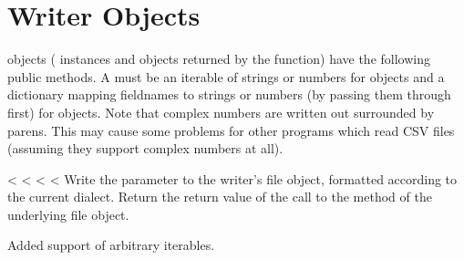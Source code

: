 \documentclass[letterpaper,10pt,english]{sphinxmanual}
\begin{document}
\section{Writer Objects}
\label{\detokenize{csv:writer-objects}}
 objects ({\hyperref[\detokenize{csv:csv.DictWriter}]{}} instances and objects returned by
the {\hyperref[\detokenize{csv:csv.writer}]{}} function) have the following public methods.  A  must be
an iterable of strings or numbers for  objects and a dictionary
mapping fieldnames to strings or numbers (by passing them through 
first) for {\hyperref[\detokenize{csv:csv.DictWriter}]{}} objects.  Note that complex numbers are written
out surrounded by parens. This may cause some problems for other programs which
read CSV files (assuming they support complex numbers at all).

\vspace{5px}

\begin{fulllineitems}
\label{\detokenize{csv:csv.csvwriter.writerow}}
<%
\pysigstartsignatures
<%
<%
<%
Write the  parameter to the writer’s file object, formatted according to
the current dialect. Return the return value of the call to the  method
of the underlying file object.

Added support of arbitrary iterables.

\end{fulllineitems}


\vspace{5px}
\end{document}
